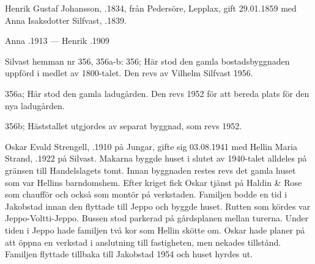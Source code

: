Henrik Gustaf Johansson, .1834, från Pedersöre, Lepplax, gift 29.01.1859 med Anna Isaksdotter Silfvast, .1839.
\begin{jhchildren}
  \item {}
  \item {}
  \item {}
  \item {}
\end{jhchildren}

Anna .1913  ---  Henrik .1909

Silvast hemman nr 356, 356a-b:
356; Här stod den gamla bostadsbyggnaden uppförd i medlet av 1800-talet. Den revs av Vilhelm Silfvast 1956.

356a; Här stod den gamla ladugården. Den revs 1952 för att bereda plats för den nya ladugården.

356b; Häststallet utgjordes av separat byggnad, som revs 1952.






Oskar Evald Strengell, .1910 på Jungar, gifte sig 03.08.1941 med Hellin Maria Strand, .1922 på Silvast. Makarna byggde huset i slutet av 1940-talet alldeles på gränsen till Handelslagets tomt. Innan byggnaden restes revs det gamla huset som var Hellins barndomshem. Efter kriget fick Oskar tjänst på Haldin \& Rose som chaufför och också som montör på verkstaden. Familjen bodde en tid i Jakobstad innan den flyttade till Jeppo och byggde huset. Rutten som kördes var Jeppo-Voltti-Jeppo. Bussen stod parkerad på gårdsplanen mellan turerna. Under tiden i Jeppo hade familjen två kor som Hellin skötte om. Oskar hade planer på att öppna en verkstad i anslutning till fastigheten, men nekades tillstånd. Familjen flyttade tillbaka till Jakobstad 1954 och huset hyrdes ut.
\begin{jhchildren}
  \item {}
  \item {}
\end{jhchildren}

